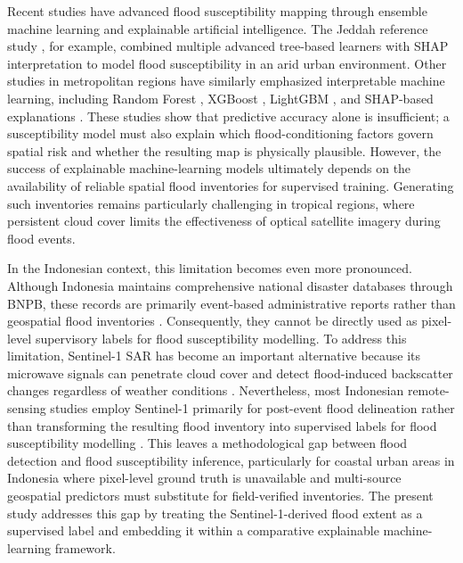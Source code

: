 \documentclass[11pt,twoside]{article}
\begin{document}
Recent studies have advanced flood susceptibility mapping through ensemble
machine learning and explainable artificial intelligence. The Jeddah reference
study \cite{jeddah2025}, for example, combined multiple advanced tree-based
learners with SHAP interpretation to model flood susceptibility in an arid urban
environment. Other studies in metropolitan regions have similarly emphasized
interpretable machine learning, including Random Forest \cite{breiman2001},
XGBoost \cite{chen2016}, LightGBM \cite{ke2017}, and SHAP-based explanations
\cite{lundberg2017}. These studies
show that predictive accuracy alone is insufficient; a susceptibility model must
also explain which flood-conditioning factors govern spatial risk and whether the
resulting map is physically plausible. However, the success of explainable machine-learning models ultimately depends on the availability of reliable spatial flood inventories for supervised training. Generating such inventories remains particularly challenging in tropical regions, where persistent cloud cover limits the effectiveness of optical satellite imagery during flood events.
 
In the Indonesian context, this limitation becomes even more pronounced. Although Indonesia maintains comprehensive national disaster databases through BNPB, these records are primarily event-based administrative reports rather than geospatial flood inventories \cite{BNPB2023_JuklakData}. Consequently, they cannot be directly used as pixel-level supervisory labels for flood susceptibility modelling. To address this limitation, Sentinel-1 SAR has become an important alternative because its microwave signals can penetrate cloud cover and detect flood-induced backscatter changes regardless of weather conditions \cite{Zhao2025}. Nevertheless, most Indonesian remote-sensing studies employ Sentinel-1 primarily for post-event flood delineation rather than transforming the resulting flood inventory into supervised labels for flood susceptibility modelling \cite{unspider2024}. This leaves a methodological gap between flood detection
and flood susceptibility inference, particularly for coastal urban areas in
Indonesia where pixel-level ground truth is unavailable and multi-source
geospatial predictors must substitute for field-verified inventories. The
present study addresses this gap by treating the Sentinel-1-derived flood extent
as a supervised label and embedding it within a comparative explainable
machine-learning framework.
 
\end{document}
